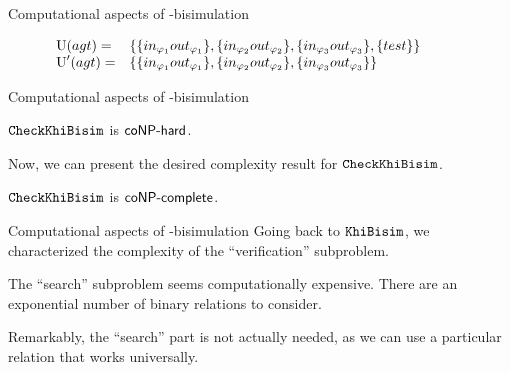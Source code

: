 \documentclass{beamer}
\begin{document}
\begin{frame}{Computational aspects of \KHilogic-bisimulation}
\begin{figure}[t]
\begin{small}
\begin{center}
                    $\begin{array}{ll}
                        \operatorname{U}(agt) = &
                         \left\{\{in_{\varphi_1}out_{\varphi_1}\},
                        \{in_{\varphi_2}out_{\varphi_2}\},
                        \{in_{\varphi_3}out_{\varphi_3}\},
                        \{test\} \right\}\\
                        \operatorname{U}'(agt) = & 
                        \left\{\{in_{\varphi_1}out_{\varphi_1}\},
                        \{in_{\varphi_2}out_{\varphi_2}\},
                        \{in_{\varphi_3}out_{\varphi_3}\} \right\}
                    \end{array}$
    \end{center}
    \end{small}
    \end{figure}
\end{frame}


\begin{frame}{Computational aspects of \KHilogic-bisimulation}
    \begin{lemma}
        $\mathtt{CheckKhiBisim}$ is $\rm\textsf{coNP-hard}$.
    \end{lemma}\pause

    \vspace{5mm}

    Now, we can present the desired complexity result for $\mathtt{CheckKhiBisim}$.\pause

    \vspace{5mm}

    \begin{theorem}
        $\mathtt{CheckKhiBisim}$ is $\rm\textsf{coNP-complete}$.
    \end{theorem}
\end{frame}


\begin{frame}{Computational aspects of \KHilogic-bisimulation}
    Going back to $\mathtt{KhiBisim}$, we characterized the complexity of the ``verification'' subproblem.\pause

    The ``search'' subproblem seems computationally expensive. There are an exponential number of binary relations to consider. \pause

    Remarkably, the ``search'' part is not actually needed, as we can use a particular relation that works universally. 
\end{frame}
\end{document}
